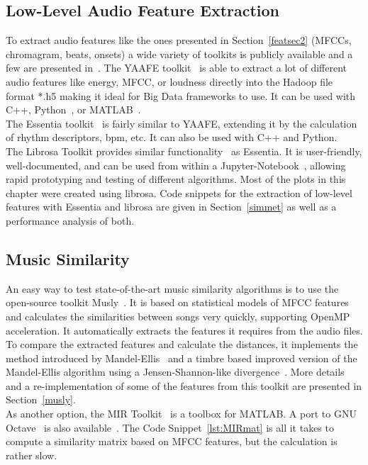 \subsection{Low-Level Audio Feature Extraction}
To extract audio features like the ones presented in Section~\ref{featsec2} (MFCCs, chromagram, beats, onsets) a wide variety of toolkits is publicly available and a few are presented in~\cite{audiofeattoolb}.
The YAAFE toolkit~\cite{yaafe1} is able to extract a lot of different audio features like energy, MFCC, or loudness directly into the Hadoop file format *.h5 making it ideal for Big Data frameworks to use. It can be used with C++, Python~\cite{pylang}, or MATLAB~\cite{matl1}.\\
The Essentia toolkit~\cite{essentia1} is fairly similar to YAAFE, extending it by the calculation of rhythm descriptors, bpm, etc. It can also be used with C++ and Python.\\
The Librosa Toolkit provides similar functionality~\cite{labrosa1} as Essentia. It is user-friendly, well-documented, and can be used from within a Jupyter-Notebook~\cite{jupyter}, allowing rapid prototyping and testing of different algorithms. Most of the plots in this chapter were created using librosa. Code snippets for the extraction of low-level features with Essentia and librosa are given in Section~\ref{simmet} as well as a performance analysis of both.\\

\subsection{Music Similarity}

An easy way to test state-of-the-art music similarity algorithms is to use the open-source toolkit Musly~\cite{musly1}. It is based on statistical models of MFCC features and calculates the similarities between songs very quickly, supporting OpenMP acceleration. It automatically extracts the features it requires from the audio files. To compare the extracted features and calculate the distances, it implements the method introduced by Mandel-Ellis~\cite{mandelellis1} and a timbre based improved version of the Mandel-Ellis algorithm using a Jensen-Shannon-like divergence~\cite{musly2}. More details and a re-implementation of some of the features from this toolkit are presented in Section~\ref{musly}.\\
As another option, the MIR Toolkit~\cite{mirtoolbox1} is a toolbox for MATLAB. A port to GNU Octave~\cite{octave1} is also available~\cite{mirtoolbox2}. The Code Snippet~\ref{lst:MIRmat} is all it takes to compute a similarity matrix based on MFCC features, but the calculation is rather slow.


